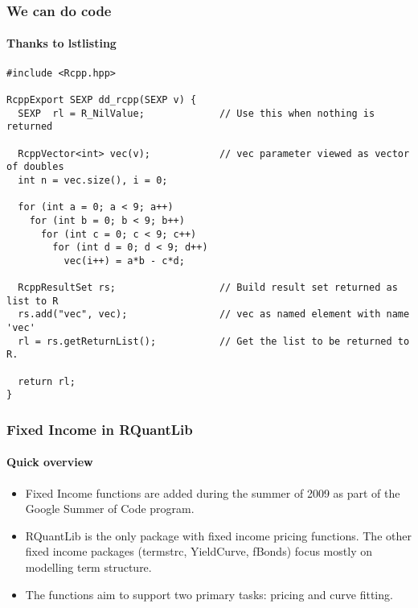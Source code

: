 \documentclass[smaller,compress]{beamer}
\begin{document}
\begin{frame}[fragile]  %
  \frametitle{We can do code}
  \framesubtitle{Thanks to lstlisting}

\lstset{language=C++,basicstyle=\tiny}
\begin{lstlisting}
#include <Rcpp.hpp>

RcppExport SEXP dd_rcpp(SEXP v) {
  SEXP  rl = R_NilValue;             // Use this when nothing is returned

  RcppVector<int> vec(v);            // vec parameter viewed as vector of doubles
  int n = vec.size(), i = 0;

  for (int a = 0; a < 9; a++)
    for (int b = 0; b < 9; b++)
      for (int c = 0; c < 9; c++)
        for (int d = 0; d < 9; d++)
          vec(i++) = a*b - c*d;

  RcppResultSet rs;                  // Build result set returned as list to R
  rs.add("vec", vec);                // vec as named element with name 'vec'
  rl = rs.getReturnList();           // Get the list to be returned to R.

  return rl;
}
\end{lstlisting}


\end{frame}

\begin{frame}
	\frametitle{Fixed Income in RQuantLib}
	\framesubtitle{Quick overview}
	\begin{itemize}
		\item Fixed Income functions are added during the summer of 2009 as part of the Google Summer of 	Code program. \pause
		\item RQuantLib is the only package with fixed income pricing functions. The other fixed income packages (termstrc, YieldCurve, fBonds) focus mostly on modelling term structure.
		\pause
		\item The functions aim to support two primary tasks: pricing and curve fitting. 		
	\end{itemize}
\end{frame}
\end{document}
